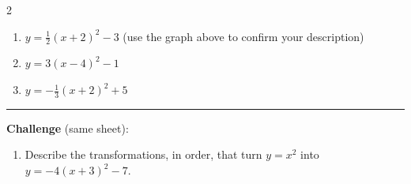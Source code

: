 \documentclass[12pt]{article}
\begin{document}
\begin{multicols}{2}
\begin{enumerate}[label=\textbf{\arabic*.}, start=9, itemsep=3cm]
  \item $y=\frac{1}{2}(x+2)^2-3$ (use the graph above to confirm your description)
  \item $\displaystyle y=3(x-4)^2-1$
  \item $\displaystyle y=-\frac{1}{3}(x+2)^2+5$
\end{enumerate}
\end{multicols}

\vspace{0.2cm}\hrule\vspace{0.3cm}
\textbf{Challenge} (same sheet):\\[4pt]
\begin{enumerate}[label=\textbf{\arabic*.}, start=12, itemsep=2.2cm]
  \item Describe the transformations, in order, that turn $y=x^2$ into $y=-4(x+3)^2-7$.
\end{enumerate}

\newpage
\end{document}
